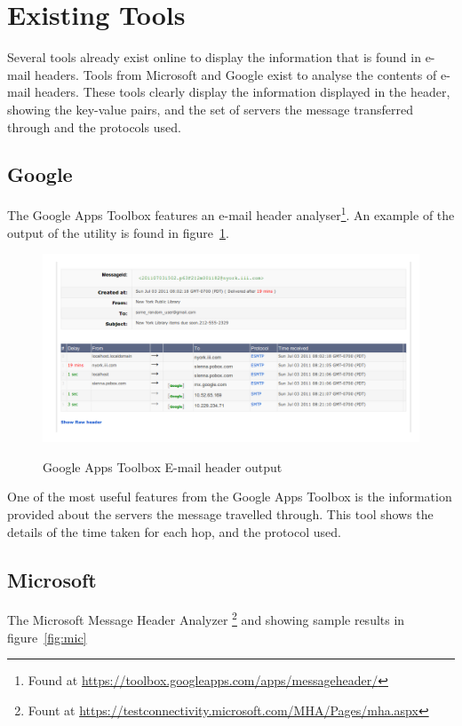\section{Existing Tools}

Several tools already exist online to display the information that is found in e-mail headers.  Tools from Microsoft and Google exist to analyse the contents of e-mail headers.  These tools clearly display the information displayed in the header, showing the key-value pairs, and the set of servers the message transferred through and the protocols used.  

\subsection{Google}
The Google Apps Toolbox features an e-mail header analyser\footnote{Found at \url{https://toolbox.googleapps.com/apps/messageheader/}}. An example of the output of the utility is found in figure~\ref{fig:goo}.

\begin{figure}
\centering %
\includegraphics[width=0.8\linewidth]{google-header} 
\label{fig:goo}
\caption{Google Apps Toolbox E-mail header output}
\end{figure}

One of the most useful features from the Google Apps Toolbox is the information provided about the servers the message travelled through.  This tool shows the details of the time taken for each hop, and the protocol used.  

\subsection{Microsoft}
The Microsoft Message Header Analyzer \footnote{Fount at \url{https://testconnectivity.microsoft.com/MHA/Pages/mha.aspx}} and showing sample results in figure~\ref{fig:mic}

